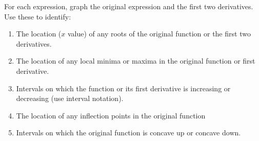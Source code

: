 \documentclass[11pt]{article}
\theoremstyle{definition}
\theoremstyle{remark}
\begin{document}
For each expression, graph the original expression and the first two derivatives. Use these to identify:
\begin{enumerate}
	\item The location ($x$ value) of any roots of the original function or the first two derivatives.
	\item The location of any local minima or maxima in the original function or first derivative.
    \item Intervals on which the function or its first derivative is increasing or decreasing (use interval notation).
    \item The location of any inflection points in the original function
    \item Intervals on which the original function is concave up or concave down.

\end{enumerate}
\end{document}
